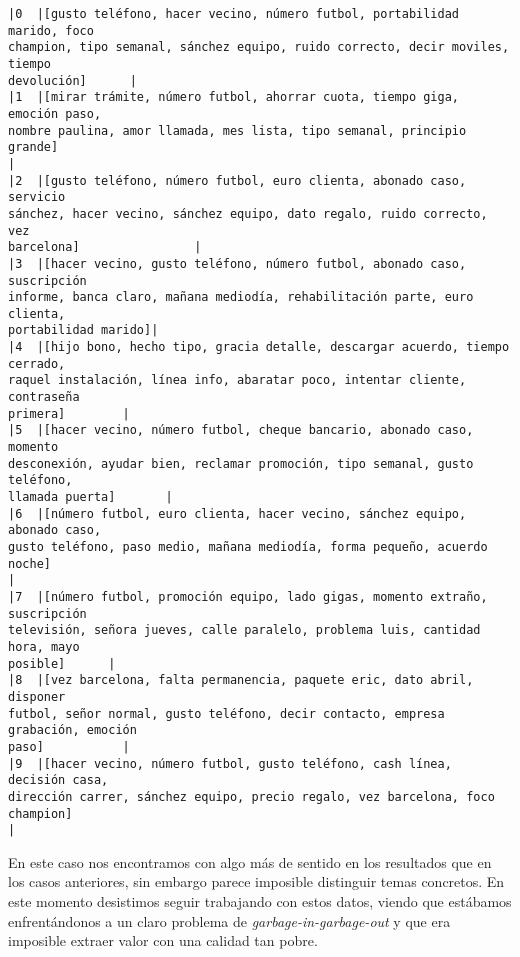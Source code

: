     \begin{Verbatim}[commandchars=\\\{\}]
|0  |[gusto teléfono, hacer vecino, número futbol, portabilidad marido, foco
champion, tipo semanal, sánchez equipo, ruido correcto, decir moviles, tiempo
devolución]      |
|1  |[mirar trámite, número futbol, ahorrar cuota, tiempo giga, emoción paso,
nombre paulina, amor llamada, mes lista, tipo semanal, principio grande]
|
|2  |[gusto teléfono, número futbol, euro clienta, abonado caso, servicio
sánchez, hacer vecino, sánchez equipo, dato regalo, ruido correcto, vez
barcelona]                |
|3  |[hacer vecino, gusto teléfono, número futbol, abonado caso, suscripción
informe, banca claro, mañana mediodía, rehabilitación parte, euro clienta,
portabilidad marido]|
|4  |[hijo bono, hecho tipo, gracia detalle, descargar acuerdo, tiempo cerrado,
raquel instalación, línea info, abaratar poco, intentar cliente, contraseña
primera]        |
|5  |[hacer vecino, número futbol, cheque bancario, abonado caso, momento
desconexión, ayudar bien, reclamar promoción, tipo semanal, gusto teléfono,
llamada puerta]       |
|6  |[número futbol, euro clienta, hacer vecino, sánchez equipo, abonado caso,
gusto teléfono, paso medio, mañana mediodía, forma pequeño, acuerdo noche]
|
|7  |[número futbol, promoción equipo, lado gigas, momento extraño, suscripción
televisión, señora jueves, calle paralelo, problema luis, cantidad hora, mayo
posible]      |
|8  |[vez barcelona, falta permanencia, paquete eric, dato abril, disponer
futbol, señor normal, gusto teléfono, decir contacto, empresa grabación, emoción
paso]           |
|9  |[hacer vecino, número futbol, gusto teléfono, cash línea, decisión casa,
dirección carrer, sánchez equipo, precio regalo, vez barcelona, foco champion]
|

    \end{Verbatim}

En este caso nos encontramos con algo más de sentido en los resultados que en los casos anteriores, sin embargo parece imposible distinguir temas concretos. En este momento desistimos seguir trabajando con estos datos, viendo que estábamos enfrentándonos a un claro problema de \textit{garbage-in-garbage-out} y que era imposible extraer valor con una calidad tan pobre.




